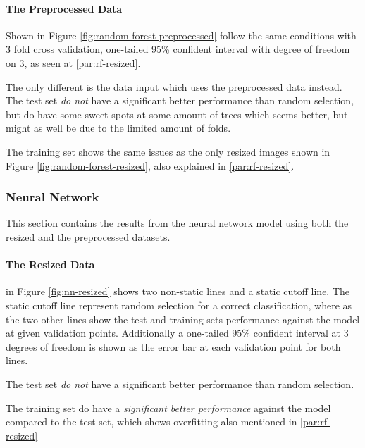 \paragraph{The Preprocessed Data}
Shown in Figure \ref{fig:random-forest-preprocessed} follow the same conditions with 3 fold cross validation, one-tailed 95\% confident interval with degree of freedom on 3, as seen at \ref{par:rf-resized}.

The only different is the data input which uses the preprocessed data instead.
The test set \emph{do not} have a significant better performance than random selection, but do have some sweet spots at some amount of trees which seems better, but might as well be due to the limited amount of folds.

The training set shows the same issues as the only resized images shown in Figure \ref{fig:random-forest-resized}, also explained in \ref{par:rf-resized}.

\subsubsection{Neural Network}
\label{subsubsec:neuralnetwork}
This section contains the results from the neural network model using both the resized and the preprocessed datasets.

\paragraph{The Resized Data}
in Figure \ref{fig:nn-resized} shows two non-static lines and a static cutoff line.
The static cutoff line represent random selection for a correct classification, where as the two other lines show the test and training sets performance against the model at given validation points. Additionally a one-tailed 95\% confident interval at 3 degrees of freedom is shown as the error bar at each validation point for both lines.

The test set \emph{do not} have a significant better performance than random selection.

The training set do have a \emph{significant better performance} against the model compared to the test set, which shows overfitting also mentioned in \ref{par:rf-resized}

